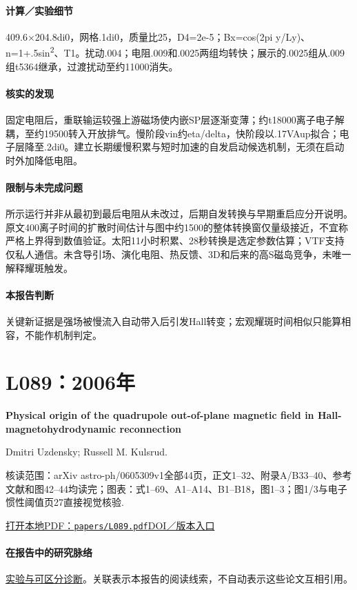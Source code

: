 \paragraph{计算／实验细节}409.6×204.8di0，网格.1di0，质量比25，D4=2e-5；Bx=cos(2pi y/Ly)、n=1+.5sin\textsuperscript{2}、T1。扰动.004；电阻.009和.0025两组均转快；展示的.0025组从.009组t5364继承，过渡扰动至约11000消失。

\paragraph{核实的发现}固定电阻后，重联输运较强上游磁场使内嵌SP层逐渐变薄；约t18000离子电子解耦，至约19500转入开放排气。慢阶段vin约eta/delta，快阶段以.17VAup拟合；电子层降至.2di0。建立长期缓慢积累与短时加速的自发启动候选机制，无须在启动时外加降低电阻。

\paragraph{限制与未完成问题}所示运行并非从最初到最后电阻从未改过，后期自发转换与早期重启应分开说明。原文400离子时间的扩散时间估计与图中约1500的整体转换窗仅量级接近，不宜称严格上界得到数值验证。太阳11小时积累、28秒转换是选定参数估算；VTF支持仅私人通信。未含导引场、演化电阻、热反馈、3D和后来的高S磁岛竞争，未唯一解释耀斑触发。

\paragraph{本报告判断}关键新证据是强场被慢流入自动带入后引发Hall转变；宏观耀斑时间相似只能算相容，不能作机制判定。

\section{L089：2006年}\label{paper:L089}

\textbf{Physical origin of the quadrupole out-of-plane magnetic field in Hall-magnetohydrodynamic reconnection}\citep{L089}\

Dmitri Uzdensky;  Russell M. Kulsrud.

\textsf{核读范围：}arXiv astro-ph/0605309v1全部44页，正文1–32、附录A/B33–40、参考文献和图42–44均读完；\textsf{图表：}式1–69、A1–A14、B1–B18，图1–3；图1/3与电子惯性阈值页27直接视觉核验.

\href{run:papers/L089.pdf}{打开本地PDF：\texttt{papers/L089.pdf}}\quad\href{https://doi.org/10.1063/1.2209627}{DOI／版本入口}

\paragraph{在报告中的研究脉络}\hyperref[story:diagnostic]{实验与可区分诊断}。关联表示本报告的阅读线索，不自动表示这些论文互相引用。


